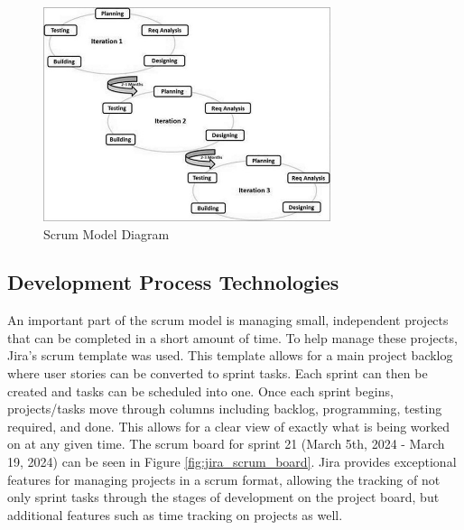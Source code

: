 
\begin{figure}[htb]
    \centering
    \includegraphics[width=0.75\textwidth]{02_dev_process/res/sdlc_agile_model.jpg}
    \caption[Scrum Model Diagram]{Scrum Model Diagram \cite{tutorialspointAgile}}
    \label{fig:scrum_model}
\end{figure}

\subsection{Development Process Technologies}
An important part of the scrum model is managing small, independent projects that can be completed in a short amount of time. To help manage these projects, Jira's scrum template was used. This template allows for a main project backlog where user stories can be converted to sprint tasks. Each sprint can then be created and tasks can be scheduled into one. Once each sprint begins, projects/tasks move through columns including backlog, programming, testing required, and done. This allows for a clear view of exactly what is being worked on at any given time. The scrum board for sprint 21 (March 5th, 2024 - March 19, 2024) can be seen in Figure \ref{fig:jira_scrum_board}. Jira provides exceptional features for managing projects in a scrum format, allowing the tracking of not only sprint tasks through the stages of development on the project board, but additional features such as time tracking on projects as well.

